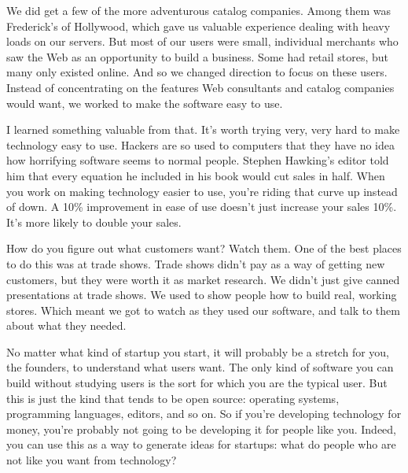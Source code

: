 We did get a few of the more adventurous
                    catalog companies. Among them was Frederick's of Hollywood,
                    which gave us valuable experience dealing with heavy loads
                    on our servers. But most of our users were small, individual
                    merchants who saw the Web as an opportunity to build a
                    business. Some had retail stores, but many only existed
                    online. And so we changed direction to focus on these users.
                    Instead of concentrating on the features Web consultants and
                    catalog companies would want, we worked to make the software
                    easy to use.

I learned something valuable from
                    that. It's worth trying very, very hard to make technology
                    easy to use. Hackers are so used to computers that they have
                    no idea how horrifying software seems to normal people.
                    Stephen Hawking's editor told him that every equation he
                    included in his book would cut sales in half. When you work
                    on making technology easier to use, you're riding that curve
                    up instead of down. A 10\% improvement in ease of use doesn't
                    just increase your sales 10\%. It's more likely to double
                    your sales.

How do you figure out what customers
                    want? Watch them. One of the best places to do this was at
                    trade shows. Trade shows didn't pay as a way of getting new
                    customers, but they were worth it as market research. We
                    didn't just give canned presentations at trade shows. We
                    used to show people how to build real, working stores. Which
                    meant we got to watch as they used our software, and talk to
                    them about what they needed.

No matter what kind
                    of startup you start, it will probably be a stretch for you,
                    the founders, to understand what users want. The only kind
                    of software you can build without studying users is the sort
                    for which you are the typical user. But this is just the
                    kind that tends to be open source: operating systems,
                    programming languages, editors, and so on. So if you're
                    developing technology for money, you're probably not going
                    to be developing it for people like you. Indeed, you can use
                    this as a way to generate ideas for startups: what do people
                    who are not like you want from technology?


